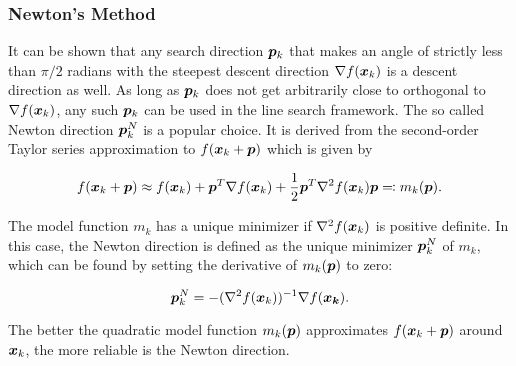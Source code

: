 \subsubsection{Newton's Method}\label{sss:newton-method}
It can be shown that any search direction $\bm{p}_k$ that makes an angle of strictly less than $\pi/2$ radians with the steepest descent
direction $\nabla f(\bm{x}_k)$ is a descent direction as well. As long as $\bm{p}_k$ does not get arbitrarily close to 
orthogonal to $\nabla f(\bm{x}_k)$, any such $\bm{p}_k$ can be used in the line search framework. The so called Newton direction $\bm{p}^N_k$ 
is a popular choice. It is derived from the second-order Taylor series approximation to $f(\bm{x}_k + \bm{p})$ which is given by

\begin{equation}\label{eq:newton-model}
    f(\bm{x}_k + \bm{p}) \approx f(\bm{x}_k) + \bm{p}^T \nabla f(\bm{x}_k) + \frac{1}{2}\bm{p}^T \nabla^2 f(\bm{x}_k) \bm{p} \eqqcolon 
    m_k(\bm{p}).
\end{equation}

\noindent The model function $m_k$ has a unique minimizer if $\nabla^2 f(\bm{x}_k)$ is positive definite. In this case, the Newton direction 
is defined
as the unique minimizer $\bm{p}^N_k$ of $m_k$, which can be found by setting the derivative of $m_k(\bm{p})$ to zero:

\begin{equation}\label{eq:newton-diretion}
    \bm{p}^N_k = - (\nabla^2 f(\bm{x}_k))^{-1} \nabla f(\bm{x_k}).
\end{equation}

\noindent The better the quadratic model function $m_k(\bm{p})$ approximates $f(\bm{x}_k + \bm{p})$ around $\bm{x}_k$, the more reliable is the 
Newton direction. 

